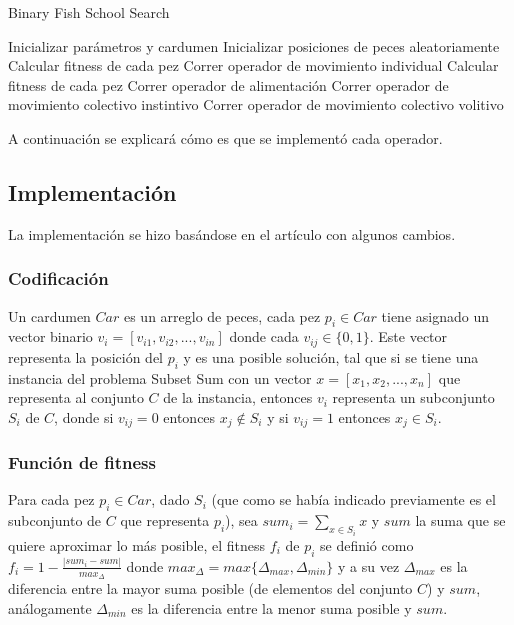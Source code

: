 \documentclass[12pt]{article}
\begin{document}
\begin{algorithm}                     
\caption{Binary Fish School Search}         
\label{alg1}                           
\begin{algorithmic}
	\STATE Inicializar parámetros y cardumen
  	\STATE Inicializar posiciones de peces aleatoriamente
        	\STATE Calcular fitness de cada pez
        	\STATE Correr operador de movimiento individual
                \STATE Calcular fitness de cada pez
                \STATE Correr operador de alimentación
                \STATE Correr operador de movimiento colectivo instintivo
                \STATE Correr operador de movimiento colectivo volitivo
	\ENDWHILE
\end{algorithmic}
\end{algorithm}

A continuación se explicará cómo es que se implementó cada operador.

\newpage

\subsection{Implementación}
La implementación se hizo basándose en el artículo \cite{articulo} con algunos cambios.

\subsubsection{Codificación}
Un cardumen $Car$ es un arreglo de peces, cada pez $p_i \in Car$ tiene asignado un vector binario $v_i = [v_{i1}, v_{i2},...,v_{in}]$ donde cada $v_{ij} \in \{0, 1\}$. Este vector representa la posición del $p_i$ y es una posible solución, tal que si se tiene una instancia del problema Subset Sum con un vector $x = [ x_1, x_2,...,x_n]$ que representa al conjunto $C$ de la instancia, entonces $v_i$ representa un subconjunto $S_i$ de $C$, donde si $v_{ij} = 0$ entonces $x_j \notin S_i$ y si $v_{ij} = 1$ entonces $x_j \in S_i$.

\subsubsection{Función de fitness}
Para cada pez $p_i \in Car$, dado $S_i$ (que como se había indicado previamente es el subconjunto de $C$ que representa $p_i$), sea $sum_i = \sum\limits_{x \in S_i}x$ y $sum$ la suma que se quiere aproximar lo más posible, el fitness $f_i$ de $p_i$ se definió como $f_i = 1 - \frac{|sum_i - sum|}{max_{\Delta}}$ donde $max_{\Delta} = max\{\Delta_{max}, \Delta_{min}\}$ y a su vez $\Delta_{max}$ es la diferencia entre la mayor suma posible (de elementos del conjunto $C$) y $sum$, análogamente $\Delta_{min}$ es la diferencia entre la menor suma posible y $sum$.
\end{document}

